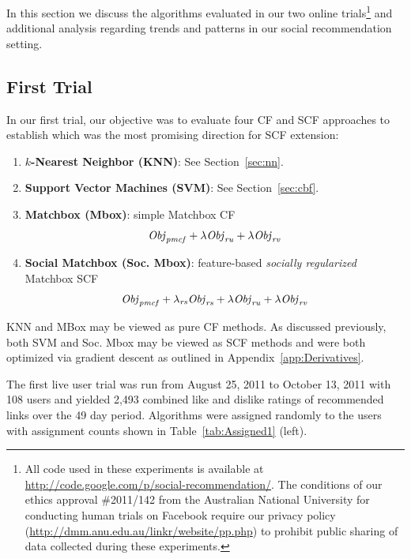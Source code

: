 In this section we discuss the algorithms evaluated in our two online
trials\footnote{All code used in these experiments is available at
\url{http://code.google.com/p/social-recommendation/}.  The conditions
of our ethics approval \#2011/142 from the Australian National
University for conducting human trials on Facebook require our
privacy policy
(\url{http://dmm.anu.edu.au/linkr/website/pp.php}) to
prohibit public sharing of data collected during these experiments.}
and additional analysis regarding trends and patterns in our social
recommendation setting.

\subsection{First Trial}

In our first trial, our objective was to evaluate four CF and SCF
approaches to establish which was the most promising direction for
SCF extension:
\begin{enumerate}
\item {\bf $k$-Nearest Neighbor (KNN)}: See Section~\ref{sec:nn}.
\item {\bf Support Vector Machines (SVM)}: See Section~\ref{sec:cbf}.
\item {\bf Matchbox (Mbox)}: simple Matchbox CF %
$$\mathit{Obj}_{\mathit{pmcf}} + \lambda \mathit{Obj}_{\mathit{ru}} + \lambda \mathit{Obj}_{\mathit{rv}}$$
\item {\bf Social Matchbox (Soc. Mbox)}: %
feature-based \emph{socially regularized} Matchbox SCF
$$\mathit{Obj}_{\mathit{pmcf}} + \lambda_{\mathit{rs}} \mathit{Obj}_{\mathit{rs}} + \lambda \mathit{Obj}_{\mathit{ru}} + \lambda \mathit{Obj}_{\mathit{rv}}$$
\end{enumerate}
KNN and MBox may be viewed as pure CF methods.  As discussed previously,
both SVM and Soc. Mbox may be viewed as SCF methods
and were both optimized via gradient descent as outlined
in Appendix~\ref{app:Derivatives}.  

The first live user trial was run from August 25, 2011 to October 13, 2011 
with 108 users and yielded 2,493 combined like and 
dislike ratings of recommended
links over the 49 day period.  Algorithms were assigned randomly to the
users with assignment counts shown in Table~\ref{tab:Assigned1} (left).

